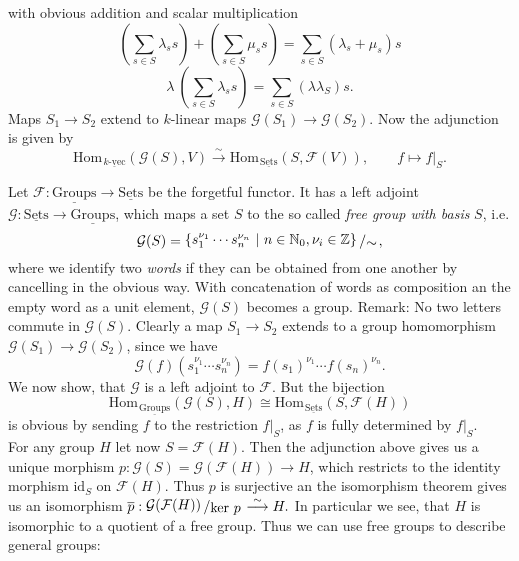 \documentclass[11pt]{book}
\numberwithin{dummy}{section}
\theoremstyle{nonumberbreak}
\newenvironment{ex}[1][]{\ifthenelse{\equal{#1}{}}{\example}{\example[#1]}\rm}{\endexample}
\newcommand{\Hom}{\mathrm{Hom}\hspace{1pt}}
\newcommand{\sets}{\underline{\mathrm{Sets}}}
\newcommand{\kvec}{\underline{k\textrm{-}\mathrm{vec}}}
\newcommand{\grp}{\underline{\mathrm{Groups}}}
\newcommand{\kernel}{\mathrm{ker}\ }
\newcommand{\F}{\mathcal{F}}
\newcommand{\G}{\mathcal{G}}
\newcommand{\la}{\longrightarrow}
\newcommand{\id}{\mathrm{id}}
\newcommand{\slant}[2]{{\raisebox{.1em}{$#1$}\left/\raisebox{-.1em}{$#2$}\right.}}
\begin{document}
\begin{spacing}{1.4}
\begin{ex}
\begin{compactenum}
with obvious addition and scalar multiplication 
$$\left( \sum_{s \in S} \lambda_s s \right) + \left( \sum_{s \in S} \mu_s s \right) = \sum_{s \in S} (\lambda_s + \mu_s) s$$
$$\lambda \ \left( \sum_{s \in S} \lambda_s s \right) = \sum_{s \in S} (\lambda \lambda_S) s.$$
Maps $S_1 \la S_2$ extend to $k$-linear maps $\G(S_1) \la \G(S_2)$. Now the adjunction is given by
$$\Hom_{\kvec}(\G(S), V) \overset{\sim}{\la} \Hom_{\sets}(S, \F(V)), \qquad f \mapsto f\vert_S.$$

\item Let $\F: \grp \la \sets$ be the forgetful functor. It has a left adjoint $\G: \sets \la \grp$, which maps a set $S$ to the so called \textit{free group with basis} $S$, i.e.
$$\G(S)= \slant{\left\{ s_1^{\nu_1} \cdots s_n^{\nu_n} \ \vert \ n \in \mathbb{N}_0, \nu_i \in \mathbb{Z} \right\} }{\sim},$$
where we identify two \textit{words} if they can be obtained from one another by cancelling in the obvious way. With concatenation of words as composition an the empty word as a unit element, $\G(S)$ becomes a group. Remark: No two letters commute in $\G(S)$. Clearly a map $S_1 \la S_2$ extends to a group homomorphism $\G(S_1) \la \G(S_2)$, since we have
$$\G(f)(s_1^{\nu_1} \cdots s_n^{\nu_n}) = f(s_1)^{\nu_1} \cdots f(s_n)^{\nu_n}.$$
We now show, that $\G$ is a left adjoint to $\F$. But the bijection
$$\Hom_{\grp}(\G(S), H) \cong \Hom_{\sets}(S, \F(H))$$
is obvious by sending $f$ to the restriction $f \vert_S$, as $f$ is fully determined by $f\vert_S$.\\
For any group $H$ let now $S= \F(H)$. Then the adjunction above gives us a unique morphism $p: \G(S) = \G(\F(H)) \la H$, which restricts to the identity morphism $\id_S$ on $\F(H)$. Thus $p$ is surjective an the isomorphism theorem gives us an isomorphism
$\overline{p}: \slant{\G(\F(H))}{\kernel p} \overset{\sim}{\la} H.$
In particular we see, that $H$ is isomorphic to a quotient of a free group. Thus we can use free groups to describe general groups:


\end{compactenum}

\end{ex}




\end{spacing}
\end{document}
